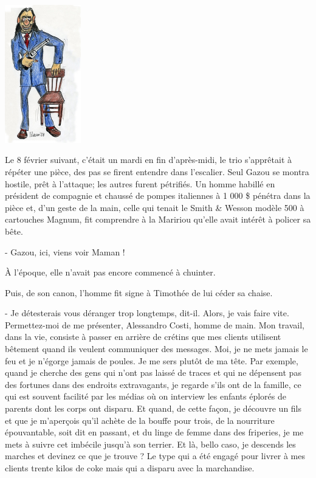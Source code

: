\begin{floatingfigure}[l]{40mm}
\includegraphics[height=60mm]{corps/chapitre5/img/alessandro.jpg}
\end{floatingfigure}

Le 8 février suivant, c’était un mardi en fin d’après-midi, le trio s’apprêtait à répéter une pièce, des pas se firent entendre dans l’escalier. Seul Gazou se montra hostile, prêt à l’attaque; les autres furent pétrifiés. Un homme habillé en président de compagnie et chaussé de pompes italiennes à 1 000 \$ pénétra dans la pièce et, d’un geste de la main, celle qui tenait le Smith \& Wesson modèle 500 à cartouches Magnum, fit comprendre à la Maririou qu’elle avait intérêt à policer sa bête.

- Gazou, ici, viens voir Maman !

À l’époque, elle n’avait pas encore commencé à chuinter.

Puis, de son canon, l’homme fit signe à Timothée de lui céder sa chaise.

- Je détesterais vous déranger trop longtemps, dit-il. Alors, je vais faire vite. Permettez-moi de me présenter, Alessandro Costi, homme de main. Mon travail, dans la vie, consiste à passer en arrière de crétins que mes clients utilisent bêtement quand ils veulent communiquer des messages. Moi, je ne mets jamais le feu et je n’égorge jamais de poules. Je me sers plutôt de ma tête. Par exemple, quand je cherche des gens qui n’ont pas laissé de traces et qui ne dépensent pas des fortunes dans des endroits extravagants, je regarde s’ils ont de la famille, ce qui est souvent facilité par les médias où on interview les enfants éplorés de parents dont les corps ont disparu. Et quand, de cette façon, je découvre un fils et que je m’aperçois qu’il achète de la bouffe pour trois, de la nourriture épouvantable, soit dit en passant, et du linge de femme dans des friperies, je me mets à suivre cet imbécile jusqu’à son terrier. Et là, bello caso, je descends les marches et devinez ce que je trouve ? Le type qui a été engagé pour livrer à mes clients trente kilos de coke mais qui a disparu avec la marchandise.

